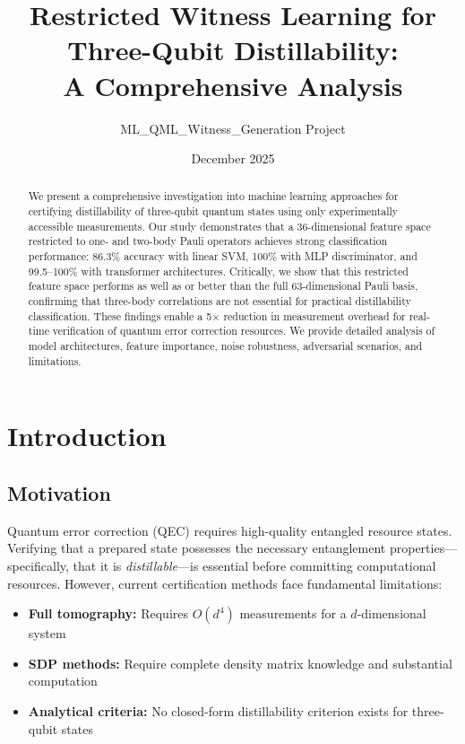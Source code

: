 \documentclass[11pt,a4paper]{article}
\title{Restricted Witness Learning for Three-Qubit Distillability:\\A Comprehensive Analysis}
\author{ML\_QML\_Witness\_Generation Project}
\date{December 2025}
\begin{document}
\maketitle

\begin{abstract}
We present a comprehensive investigation into machine learning approaches for certifying distillability of three-qubit quantum states using only experimentally accessible measurements. Our study demonstrates that a 36-dimensional feature space restricted to one- and two-body Pauli operators achieves strong classification performance: 86.3\% accuracy with linear SVM, 100\% with MLP discriminator, and 99.5--100\% with transformer architectures. Critically, we show that this restricted feature space performs as well as or better than the full 63-dimensional Pauli basis, confirming that three-body correlations are not essential for practical distillability classification. These findings enable a 5$\times$ reduction in measurement overhead for real-time verification of quantum error correction resources. We provide detailed analysis of model architectures, feature importance, noise robustness, adversarial scenarios, and limitations.
\end{abstract}

\tableofcontents
\newpage

\section{Introduction}

\subsection{Motivation}

Quantum error correction (QEC) requires high-quality entangled resource states. Verifying that a prepared state possesses the necessary entanglement properties---specifically, that it is \emph{distillable}---is essential before committing computational resources. However, current certification methods face fundamental limitations:

\begin{itemize}[noitemsep]
    \item \textbf{Full tomography:} Requires $O(d^4)$ measurements for a $d$-dimensional system
    \item \textbf{SDP methods:} Require complete density matrix knowledge and substantial computation
    \item \textbf{Analytical criteria:} No closed-form distillability criterion exists for three-qubit states
\end{itemize}
\end{document}
